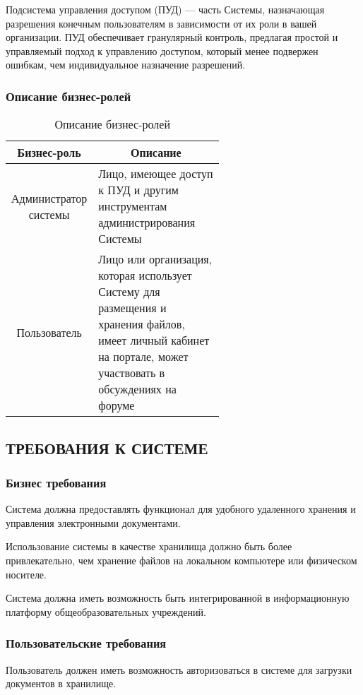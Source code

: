\documentclass[a4paper,14pt]{extarticle}
\begin{document}
Подсистема управления доступом (ПУД) --- часть Системы, назначающая разрешения конечным пользователям в зависимости от их роли в вашей организации. ПУД обеспечивает гранулярный контроль, предлагая простой и управляемый подход к управлению доступом, который менее подвержен ошибкам, чем индивидуальное назначение разрешений.

\subsubsection{Описание бизнес-ролей}
\begin{table}[h!]
	\caption{Описание бизнес-ролей}\label{tab:roles}
	\begin{tabular}{|c|p{0.6\linewidth}|}
		\hline 
		\textbf{Бизнес-роль} & \multicolumn{1}{c|}{\textbf{Описание}}\\ \hline
		Администратор системы & Лицо, имеющее доступ к ПУД и другим инструментам администрирования Системы \\ \hline
		Пользователь & Лицо или организация, которая использует Систему для размещения и хранения файлов, имеет личный кабинет на портале, может участвовать в обсуждениях на форуме\\ \hline
	\end{tabular}
\end{table}


\newpage
\subsection{ТРЕБОВАНИЯ К СИСТЕМЕ}
\subsubsection{Бизнес требования}

Система должна предоставлять функционал для удобного удаленного хранения и управления электронными документами.

Использование системы в качестве хранилища должно быть более привлекательно, чем хранение файлов на локальном компьютере или физическом носителе.

Система должна иметь возможность быть интегрированной в информационную платформу общеобразовательных учреждений.


\subsubsection{Пользовательские требования}
Пользователь должен иметь возможность авторизоваться в системе для загрузки документов в хранилище.
\end{document}
